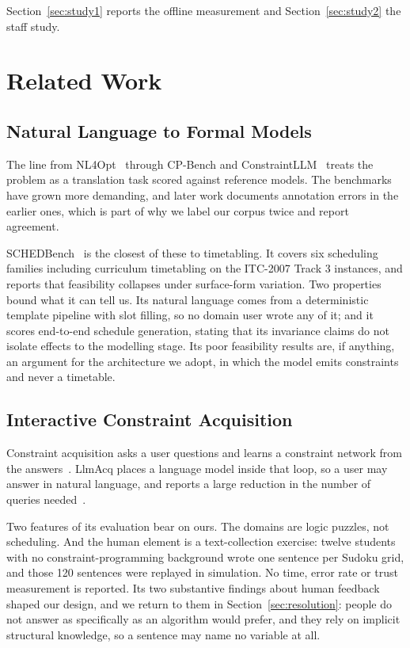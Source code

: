 \documentclass[acmsmall,screen,review,anonymous]{acmart}
\begin{document}
Section~\ref{sec:study1} reports the offline measurement and
Section~\ref{sec:study2} the staff study.

\section{Related Work}

\subsection{Natural Language to Formal Models}

The line from NL4Opt~\cite{ramamonjison2022nl4opt} through CP-Bench
\cite{michailidis2025cpbench} and ConstraintLLM~\cite{shi2025constraintllm}
treats the problem as a translation task scored against reference models. The
benchmarks have grown more demanding, and later work documents annotation
errors in the earlier ones, which is part of why we label our corpus twice and
report agreement.

SCHEDBench~\cite{sharma2026schedbench} is the closest of these to timetabling.
It covers six scheduling families including curriculum timetabling on the
ITC-2007 Track 3 instances, and reports that feasibility collapses under
surface-form variation. Two properties bound what it can tell us. Its natural
language comes from a deterministic template pipeline with slot filling, so no
domain user wrote any of it; and it scores end-to-end schedule generation,
stating that its invariance claims do not isolate effects to the modelling
stage. Its poor feasibility results are, if anything, an argument for the
architecture we adopt, in which the model emits constraints and never a
timetable.

\subsection{Interactive Constraint Acquisition}

Constraint acquisition asks a user questions and learns a constraint network
from the answers~\cite{bessiere2023partialqueries}. LlmAcq places a language
model inside that loop, so a user may answer in natural language, and reports a
large reduction in the number of queries needed~\cite{mechqrane2026llmacq}.

Two features of its evaluation bear on ours. The domains are logic puzzles, not
scheduling. And the human element is a text-collection exercise: twelve
students with no constraint-programming background wrote one sentence per
Sudoku grid, and those 120 sentences were replayed in simulation. No time,
error rate or trust measurement is reported. Its two substantive findings about
human feedback shaped our design, and we return to them in
Section~\ref{sec:resolution}: people do not answer as specifically as an
algorithm would prefer, and they rely on implicit structural knowledge, so a
sentence may name no variable at all.
\end{document}
